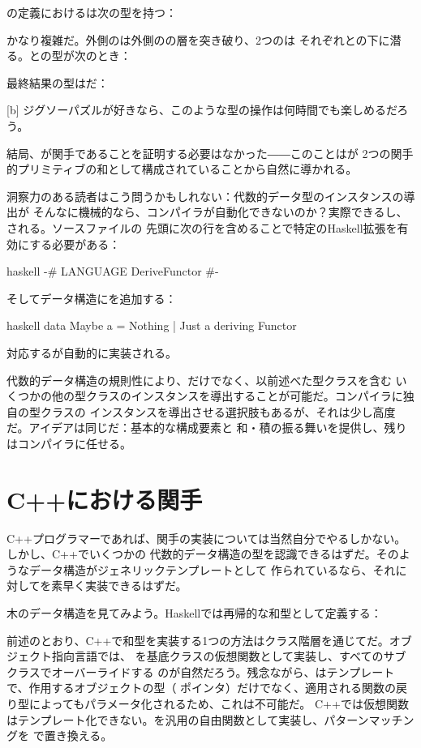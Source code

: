 の定義におけるは次の型を持つ：

かなり複雑だ。外側のは外側のの層を突き破り、2つのは
それぞれとの下に潜る。との型が次のとき：

最終結果の型はだ：

[b]
ジグソーパズルが好きなら、このような型の操作は何時間でも楽しめるだろう。

結局、が関手であることを証明する必要はなかった――このことはが
2つの関手的プリミティブの和として構成されていることから自然に導かれる。

洞察力のある読者はこう問うかもしれない：代数的データ型のインスタンスの導出が
そんなに機械的なら、コンパイラが自動化できないのか？実際できるし、される。ソースファイルの
先頭に次の行を含めることで特定のHaskell拡張を有効にする必要がある：

\begin{snip}{haskell}
{-# LANGUAGE DeriveFunctor #-}
\end{snip}
そしてデータ構造にを追加する：

\begin{snip}{haskell}
data Maybe a = Nothing | Just a deriving Functor
\end{snip}
対応するが自動的に実装される。

代数的データ構造の規則性により、だけでなく、以前述べた型クラスを含む
いくつかの他の型クラスのインスタンスを導出することが可能だ。コンパイラに独自の型クラスの
インスタンスを導出させる選択肢もあるが、それは少し高度だ。アイデアは同じだ：基本的な構成要素と
和・積の振る舞いを提供し、残りはコンパイラに任せる。

\section{C++における関手}

C++プログラマーであれば、関手の実装については当然自分でやるしかない。しかし、C++でいくつかの
代数的データ構造の型を認識できるはずだ。そのようなデータ構造がジェネリックテンプレートとして
作られているなら、それに対してを素早く実装できるはずだ。

木のデータ構造を見てみよう。Haskellでは再帰的な和型として定義する：

前述のとおり、C++で和型を実装する1つの方法はクラス階層を通じてだ。オブジェクト指向言語では、
を基底クラスの仮想関数として実装し、すべてのサブクラスでオーバーライドする
のが自然だろう。残念ながら、はテンプレートで、作用するオブジェクトの型（
ポインタ）だけでなく、適用される関数の戻り型によってもパラメータ化されるため、これは不可能だ。
C++では仮想関数はテンプレート化できない。を汎用の自由関数として実装し、パターンマッチングを
で置き換える。

